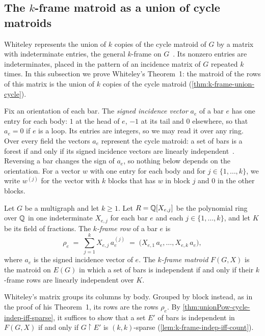 \subsection{The $k$-frame matroid as a union of cycle matroids}
\label{sec:body-bar-k-frame}

Whiteley represents the union of $k$ copies of the cycle matroid of $G$
by a matrix with indeterminate entries, the general $k$-frame
on $G$~\cite[Definition~2.2]{whiteley1988}. Its nonzero entries are
indeterminates, placed in the pattern of an incidence matrix of $G$
repeated $k$ times. In this subsection we prove Whiteley's Theorem~1:
the matroid of the rows of this matrix is the union of $k$ copies of the
cycle matroid (\cref{thm:k-frame-union-cycle}).

Fix an orientation of each bar. The \emph{signed incidence vector}
$a_e$ of a bar $e$ has one entry for each body: $1$ at the head of $e$,
$-1$ at its tail and $0$ elsewhere, so that $a_e = 0$ if $e$ is a loop.
Its entries are integers, so we may read it over any ring. Over every
field the vectors $a_e$ represent the cycle matroid: a set of bars is a
forest if and only if its signed incidence vectors are linearly
independent~\cite[Lemma~5.1.3]{oxley2011}. Reversing a bar changes the
sign of $a_e$, so nothing below depends on the orientation. For a
vector $w$ with one entry for each body and for
$j \in \{1, \dots, k\}$, we write $w^{(j)}$ for the vector with $k$
blocks that has $w$ in block $j$ and $0$ in the other blocks.

\begin{definition}
  \label{def:k-frame-matroid}
  \leanok
  Let $G$ be a multigraph and let $k \ge 1$. Let $R = {\mathbb{Q}}[X_{e,j}]$ be
  the polynomial ring over ${\mathbb{Q}}$ in one indeterminate $X_{e,j}$ for each
  bar $e$ and each $j \in \{1, \dots, k\}$, and let $K$ be its field of
  fractions. The \emph{$k$-frame row} of a bar $e$ is
  \[
    \rho_e \;=\; \sum_{j = 1}^{k} X_{e,j}\, a_e^{(j)}
    \;=\; \bigl(X_{e,1}\, a_e, \dots, X_{e,k}\, a_e\bigr),
  \]
  where $a_e$ is the signed incidence vector of $e$.
  The \emph{$k$-frame matroid} $F(G, X)$ is the matroid on $E(G)$ in
  which a set of bars is independent if and only if their $k$-frame
  rows are linearly independent over $K$.
\end{definition}

Whiteley's matrix groups its columns by body. Grouped by block instead,
as in the proof of his Theorem~1, its rows are the rows $\rho_e$. By
\cref{thm:unionPow-cycle-indep-iff-sparse}, it suffices to show that a
set $E'$ of bars is independent in $F(G, X)$ if and only if
$G \restriction E'$ is $(k, k)$-sparse
(\cref{lem:k-frame-indep-iff-count}).

